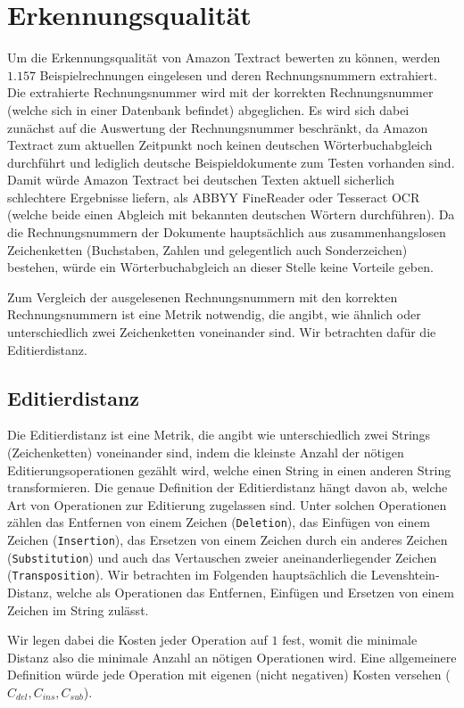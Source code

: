 \documentclass{whswinvcbook}
\begin{document}
\section{Erkennungsqualität}
Um die Erkennungsqualität von Amazon Textract bewerten zu können, werden $1.157$ Beispielrechnungen eingelesen und deren Rechnungsnummern extrahiert. Die extrahierte Rechnungsnummer wird mit der korrekten Rechnungsnummer (welche sich in einer Datenbank befindet) abgeglichen. Es wird sich dabei zunächst auf die Auswertung der Rechnungsnummer beschränkt, da Amazon Textract zum aktuellen Zeitpunkt noch keinen deutschen Wörterbuchabgleich durchführt und lediglich deutsche Beispieldokumente zum Testen vorhanden sind. Damit würde Amazon Textract bei deutschen Texten aktuell sicherlich schlechtere Ergebnisse liefern, als ABBYY FineReader oder Tesseract OCR (welche beide einen Abgleich mit bekannten deutschen Wörtern durchführen). Da die Rechnungsnummern der Dokumente hauptsächlich aus zusammenhangslosen Zeichenketten (Buchstaben, Zahlen und gelegentlich auch Sonderzeichen) bestehen, würde ein Wörterbuchabgleich an dieser Stelle keine Vorteile geben.

Zum Vergleich der ausgelesenen Rechnungsnummern mit den korrekten Rechnungsnummern ist eine Metrik notwendig, die angibt, wie ähnlich oder unterschiedlich zwei Zeichenketten voneinander sind. Wir betrachten dafür die Editierdistanz.
\subsection{Editierdistanz}
Die Editierdistanz ist eine Metrik, die angibt wie unterschiedlich zwei Strings (Zeichenketten) voneinander sind, indem die kleinste Anzahl der nötigen Editierungsoperationen gezählt wird, welche einen String in einen anderen String transformieren. Die genaue Definition der Editierdistanz hängt davon ab, welche Art von Operationen zur Editierung zugelassen sind. Unter solchen Operationen zählen das Entfernen von einem Zeichen (\texttt{Deletion}), das Einfügen von einem Zeichen (\texttt{Insertion}), das Ersetzen von einem Zeichen durch ein anderes Zeichen (\texttt{Substitution}) und auch das Vertauschen zweier aneinanderliegender Zeichen (\texttt{Transposition}). Wir betrachten im Folgenden hauptsächlich die Levenshtein-Distanz, welche als Operationen das Entfernen, Einfügen und Ersetzen von einem Zeichen im String zulässt.

Wir legen dabei die Kosten jeder Operation auf $1$ fest, womit die minimale Distanz also die minimale Anzahl an nötigen Operationen wird. Eine allgemeinere Definition würde jede Operation mit eigenen (nicht negativen) Kosten versehen ($C_{del},C_{ins},C_{sub}$).
\end{document}
